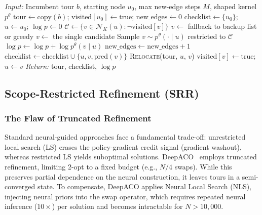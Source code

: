 \documentclass[sigconf]{acmart}
\begin{document}
\begin{algorithm}[h]
\caption{Perturbation-Based Ant Construction}
\label{alg:perturbation-app}
\begin{algorithmic}[1]
\STATE \emph{Input:} Incumbent tour $b$, starting node $u_0$, max new-edge steps $M$, shaped kernel $p^\theta$
\STATE $\text{tour} \leftarrow \text{copy}(b)$; $\text{visited}[u_0] \leftarrow \text{true}$; $\text{new\_edges} \leftarrow 0$
\STATE $\text{checklist} \leftarrow \{u_0\}$; $u \leftarrow u_0$; $\log p \leftarrow 0$
    \STATE $\mathcal{C} \leftarrow \{v \in \mathcal{N}_K(u) : \neg\text{visited}[v]\}$ 
        \STATE $v \leftarrow$ fallback to backup list or greedy
        \STATE $v \leftarrow$ the single candidate 
    \ELSE
        \STATE Sample $v \sim p^\theta(\cdot \mid u)$ restricted to $\mathcal{C}$
        \STATE $\log p \leftarrow \log p + \log p^\theta(v \mid u)$
    \ENDIF
     
        \STATE $\text{new\_edges} \leftarrow \text{new\_edges} + 1$
        \STATE $\text{checklist} \leftarrow \text{checklist} \cup \{u, v, \text{pred}(v)\}$
    \ENDIF
    \STATE \textsc{Relocate}(tour, $u$, $v$) 
    \STATE $\text{visited}[v] \leftarrow \text{true}$; $u \leftarrow v$
\ENDWHILE
\STATE \emph{Return:} tour, checklist, $\log p$
\end{algorithmic}
\end{algorithm}

\subsection{Scope-Restricted Refinement (SRR)}
\label{app:credit}

\subsubsection{The Flaw of Truncated Refinement}
Standard neural-guided approaches face a fundamental trade-off: unrestricted local search (LS) erases the policy-gradient credit signal (gradient washout), whereas restricted LS yields suboptimal solutions.
DeepACO~\cite{deepaco} employs truncated refinement, limiting 2-opt to a fixed budget (e.g., $N/4$ swaps).
While this preserves partial dependence on the neural construction, it leaves tours in a semi-converged state.
To compensate, DeepACO applies Neural Local Search (NLS), injecting neural priors into the swap operator, which requires repeated neural inference ($10{\times}$) per solution and becomes intractable for $N > 10{,}000$.
\end{document}
